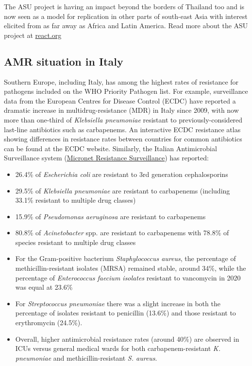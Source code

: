 \documentclass[
  11pt,
  paper=a4,
  ,captions=tableheading
]{scrartcl}
\providecommand{\tightlist}{%
  \setlength{\itemsep}{0pt}\setlength{\parskip}{0pt}}
\begin{document}
The ASU project is having an impact beyond the borders of Thailand too
and is now seen as a model for replication in other parts of south-east
Asia with interest elicited from as far away as Africa and Latin
America. Read more about the ASU project at
\href{https://www.reactgroup.org/toolbox/rational-use/examples-from-the-field/antibiotics-smart-use-thailand/}{react.org}

\hypertarget{amr-situation-in-italy}{%
\subsection*{AMR situation in Italy}\label{amr-situation-in-italy}}

Southern Europe, including Italy, has among the highest rates of
resistance for pathogens included on the WHO Priority Pathogen list. For
example, surveillance data from the European Centres for Disease Control
(ECDC) have reported a dramatic increase in multidrug-resistance (MDR)
in Italy since 2009, with now more than one-third of \emph{Klebsiella
pneumoniae} resistant to previously-considered last-line antibiotics
such as carbapenems. An interactive ECDC resistance atlas showing
differences in resistance rates between countries for common antibiotics
can be found at the ECDC website. Similarly, the Italian Antimicrobial
Surveillance system
(\href{https://www.epicentro.iss.it/antibiotico-resistenza/epidemiologia-italia}{Micronet
Resistance Surveillance}) has reported:

\begin{itemize}
\tightlist
\item
  26.4\% of \emph{Escherichia coli} are resistant to 3rd generation
  cephalosporins
\item
  29.5\% of \emph{Klebsiella pneumoniae} are resistant to carbapenems
  (including 33.1\% resistant to multiple drug classes)
\item
  15.9\% of \emph{Pseudomonas aeruginosa} are resistant to carbapenems
\item
  80.8\% of \emph{Acinetobacter} spp. are resistant to carbapenems with
  78.8\% of species resistant to multiple drug classes
\item
  For the Gram-positive bacterium \emph{Staphylococcus aureus}, the
  percentage of methicillin-resistant isolates (MRSA) remained stable,
  around 34\%, while the percentage of \emph{Enterococcus faecium
  isolates} resistant to vancomycin in 2020 was equal at 23.6\%
\item
  For \emph{Streptococcus pneumoniae} there was a slight increase in
  both the percentage of isolates resistant to penicillin (13.6\%) and
  those resistant to erythromycin (24.5\%).
\item
  Overall, higher antimicrobial resistance rates (around 40\%) are
  observed in ICUs versus general medical wards for both
  carbapenem-resistant \emph{K. pneumoniae} and methicillin-resistant
  \emph{S. aureus}.
\end{itemize}
\end{document}

